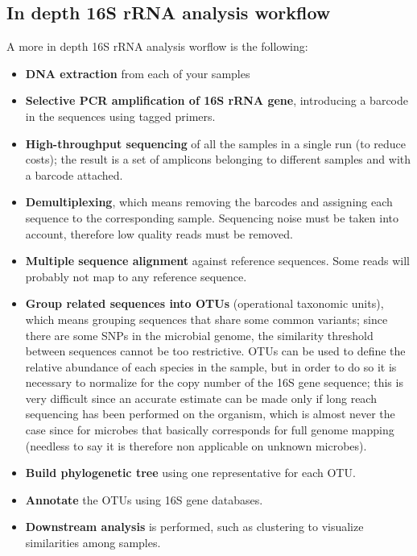   \subsection{In depth 16S rRNA analysis workflow}
    A more in depth 16S rRNA analysis worflow is the following:
    \begin{itemize}
      \item \textbf{DNA extraction} from each of your samples
      \item \textbf{Selective PCR amplification of 16S rRNA gene}, introducing a barcode in the sequences using tagged primers.
      \item \textbf{High-throughput sequencing} of all the samples in a single run (to reduce costs); the result is a set of amplicons belonging to different samples and with a barcode attached.
      \item \textbf{Demultiplexing}, which means removing the barcodes and assigning each sequence  to the corresponding sample. Sequencing noise must be taken into account, therefore low quality reads must be removed.
      \item \textbf{Multiple sequence alignment} against reference sequences. Some reads will probably not map to any reference sequence.
      \item \textbf{Group related sequences into OTUs} (operational taxonomic units), which means grouping sequences that share some common variants; since there are some SNPs in the microbial genome, the similarity threshold between sequences cannot be too restrictive. OTUs can be used to define the relative abundance of each species in the sample, but in order to do so it is necessary to normalize for the copy number of the 16S gene sequence; this is very difficult since an accurate estimate can be made only if long reach sequencing has been performed on the organism, which is almost never the case since for microbes that basically corresponds for full genome mapping (needless to say it is therefore non applicable on unknown microbes).
      \item \textbf{Build phylogenetic tree} using one representative for each OTU.
      \item \textbf{Annotate} the OTUs using 16S gene databases.
      \item \textbf{Downstream analysis} is performed, such as clustering to visualize similarities among samples.
    \end{itemize}

